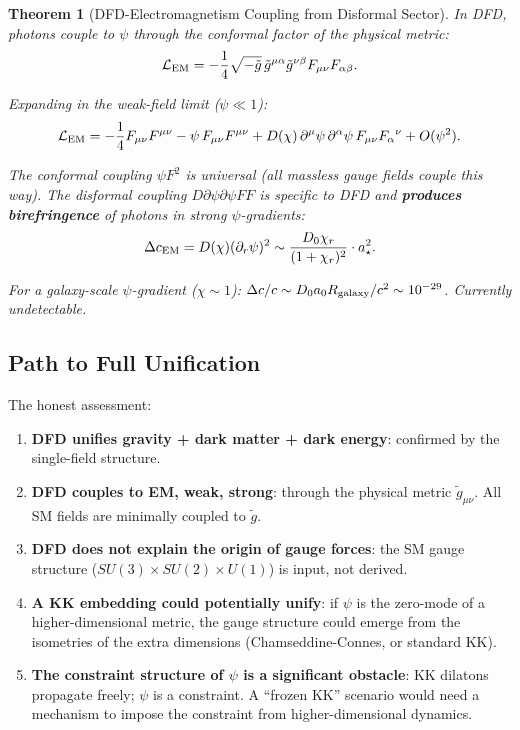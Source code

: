 \documentclass[11pt,a4paper]{article}
\newtheorem{theorem}{Theorem}
\begin{document}
\begin{theorem}[DFD-Electromagnetism Coupling from Disformal Sector]
\label{thm:EM-coupling}
In DFD, photons couple to $\psi$ through the conformal factor of the physical metric:
\begin{equation}
\mathcal{L}_{\rm EM} = -\frac{1}{4}\sqrt{-\tilde{g}}\,\tilde{g}^{\mu\alpha}\tilde{g}^{\nu\beta}F_{\mu\nu}F_{\alpha\beta}.
\end{equation}

Expanding in the weak-field limit ($\psi \ll 1$):
\begin{equation}
\mathcal{L}_{\rm EM} = -\frac{1}{4}F_{\mu\nu}F^{\mu\nu} - \psi\,F_{\mu\nu}F^{\mu\nu} + D(\chi)\,\partial^\mu\psi\,\partial^\alpha\psi\,F_{\mu\nu}F_\alpha{}^\nu + O(\psi^2).
\end{equation}

The conformal coupling $\psi F^2$ is universal (all massless gauge fields couple this way). The disformal coupling $D\partial\psi\partial\psi F F$ is specific to DFD and \textbf{produces birefringence} of photons in strong $\psi$-gradients:
\begin{equation}
\Delta c_{\rm EM} = D(\chi)(\partial_r\psi)^2 \sim \frac{D_0\chi_r}{(1+\chi_r)^2}\cdot a_\star^2.
\end{equation}

For a galaxy-scale $\psi$-gradient ($\chi \sim 1$): $\Delta c/c \sim D_0 a_0 R_{\rm galaxy}/c^2 \sim 10^{-29}$. Currently undetectable.
\end{theorem}

\subsection{Path to Full Unification}

The honest assessment:
\begin{enumerate}
\item \textbf{DFD unifies gravity + dark matter + dark energy}: confirmed by the single-field structure.
\item \textbf{DFD couples to EM, weak, strong}: through the physical metric $\tilde{g}_{\mu\nu}$. All SM fields are minimally coupled to $\tilde{g}$.
\item \textbf{DFD does not explain the origin of gauge forces}: the SM gauge structure ($SU(3)\times SU(2)\times U(1)$) is input, not derived.
\item \textbf{A KK embedding could potentially unify}: if $\psi$ is the zero-mode of a higher-dimensional metric, the gauge structure could emerge from the isometries of the extra dimensions (Chamseddine-Connes, or standard KK).
\item \textbf{The constraint structure of $\psi$ is a significant obstacle}: KK dilatons propagate freely; $\psi$ is a constraint. A ``frozen KK'' scenario would need a mechanism to impose the constraint from higher-dimensional dynamics.
\end{enumerate}
\end{document}

